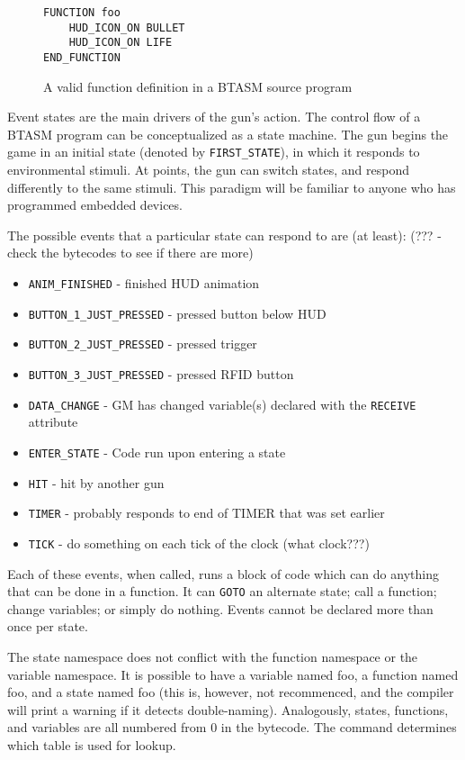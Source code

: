 \documentclass[12pt,a4paper]{scrbook}
\begin{document}
  

\begin{figure}[h]
\begin{lstlisting}
FUNCTION foo
	HUD_ICON_ON BULLET
	HUD_ICON_ON LIFE
END_FUNCTION
\end{lstlisting}
\caption{A valid function definition in a BTASM source program} 
\end{figure}


Event states are the main drivers of the gun's action.  The control flow of a BTASM program can be
conceptualized as a state machine.  The gun begins the game in an initial state (denoted by 
\texttt{FIRST\_STATE}), in which it responds to environmental stimuli.  At points, the gun can switch
states, and respond differently to the same stimuli.  This paradigm will be familiar to anyone who
has programmed embedded devices.

The possible events that a particular state can respond to are (at least): (??? - check the 
bytecodes to see if there are more)
\begin{itemize}
\item \texttt{ANIM\_FINISHED} - finished HUD animation
\item \texttt{BUTTON\_1\_JUST\_PRESSED} - pressed button below HUD
\item \texttt{BUTTON\_2\_JUST\_PRESSED} - pressed trigger
\item \texttt{BUTTON\_3\_JUST\_PRESSED} - pressed RFID button
\item \texttt{DATA\_CHANGE} - GM has changed variable(s) declared with the \texttt{RECEIVE} attribute
\item \texttt{ENTER\_STATE} - Code run upon entering a state
\item \texttt{HIT} - hit by another gun
\item \texttt{TIMER} - probably responds to end of TIMER that was set earlier
\item \texttt{TICK} - do something on each tick of the clock (what clock???)
\end{itemize}

Each of these events, when called, runs a block of code which can do anything that can be done
in a function.  It can \texttt{GOTO} an alternate state; call a function; change variables; or
simply do nothing.  Events cannot be declared more than once per state.

The state namespace does not conflict with the function namespace or the variable namespace.  It is
possible to have a variable named foo, a function named foo, and a state named foo (this is, however,
not recommenced, and the compiler will print a warning if it detects double-naming).  Analogously,
states, functions, and variables are all numbered from 0 in the bytecode.  The command determines
which table is used for lookup.
\end{document}
